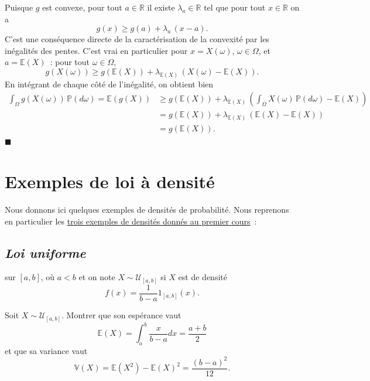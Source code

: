 \begin{preuve}
Puisque \(g\) est convexe, pour tout \(a \in \mathbb{R}\) il existe
\(\lambda_a \in \mathbb{R}\) tel que pour tout \(x\in\mathbb{R}\) on a
\[g(x) \geq g(a) + \lambda_a\,(x-a).\] C'est une conséquence directe de
la caractérisation de la convexité par les inégalités des pentes. C'est
vrai en particulier pour \(x =X(\omega)\), \(\omega \in \Omega\), et
\(a = \mathbb{E}(X)\)~: pour tout \(\omega \in \Omega\),
\[g\left(X(\omega)\right) \geq g\left(\mathbb{E}(X)\right) + \lambda_{\mathbb{E}(X)}\,\left(X(\omega) - \mathbb{E}(X)\right).\]
En intégrant de chaque côté de l'inégalité, on obtient bien
\begin{align*}
\int_\Omega g\left(X(\omega)\right) \,\mathbb{P}(d\omega) = \mathbb{E}\left(g(X)\right) &\geq g\left(\mathbb{E}(X)\right) + \lambda_{\mathbb{E}(X)}\,\left(\int_\Omega X(\omega)\,\mathbb{P}(d\omega) - \mathbb{E}(X)\right)\\
& = g\left(\mathbb{E}(X)\right) + \lambda_{\mathbb{E}(X)}\,\left(\mathbb{E}(X) - \mathbb{E}(X)\right)\\
& = g\left(\mathbb{E}(X)\right).
\end{align*}\hfill$\blacksquare$
\end{preuve}

\section{Exemples de loi à
densité}\label{II-exemples-de-loi-uxe0-densituxe9}

Nous donnons ici quelques exemples de densités de probabilité. Nous
reprenons en particulier les
\href{Probabilité\%20I.pdf\%20\#exampledens}{trois exemples de densités
donnés au premier cours}~:

\subsection*{\emph{Loi uniforme}}\label{II-loi-uniforme}

sur \([a,b]\), où \(a < b\) et on note \(X \sim \mathcal{U}_{[a,b]}\) si
\(X\) est de densité \[ f(x) = \frac{1}{b-a} 1_{[a,b]} (x).\]

\label{II-moments-unif}
Soit \(X \sim \mathcal{U}_{[a,b]}\). Montrer que son espérance vaut
\[ \mathbb{E}(X) = \int_a^b \frac{x}{b-a} dx = \frac{a+b}{2}\] et que sa
variance vaut
\[ \mathbb{V}(X) = \mathbb{E}(X^2) - \mathbb{E}(X)^2 = \frac{(b-a)^2}{12}.\]

